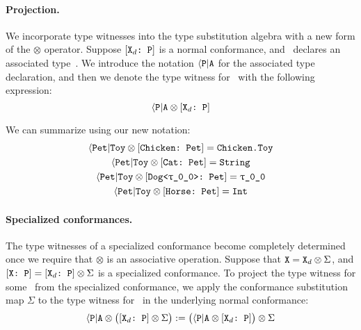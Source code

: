 \documentclass[../generics]{subfiles}
\begin{document}
\paragraph{Projection.}
We incorporate type witnesses into the type substitution algebra with a new form of the $\otimes$ operator. Suppose $[\texttt{$\texttt{X}_d$:~P}]$ is a normal conformance, and \tP\ declares an associated type~\nA. We introduce the notation $\langle\texttt{P}|\texttt{A}$ for the associated type declaration, and then we denote the type witness for \nA\ with the following expression:
\[\langle\texttt{P}|\texttt{A} \otimes [\texttt{$\texttt{X}_d$:~P}]\]

\begin{example}
We can summarize  using our new notation:
\begin{gather*}
\AssocType{Pet}{Toy}\otimes\ConfReq{Chicken}{Pet}=\texttt{Chicken.Toy}\\
\AssocType{Pet}{Toy}\otimes\ConfReq{Cat}{Pet}=\texttt{String}\\
\AssocType{Pet}{Toy}\otimes\ConfReq{Dog<\rT>}{Pet}=\rT\\
\AssocType{Pet}{Toy}\otimes\ConfReq{Horse}{Pet}=\texttt{Int}
\end{gather*}
\end{example}

\paragraph{Specialized conformances.}
The type witnesses of a specialized conformance become completely determined once we require that $\otimes$ is an associative operation. Suppose that $\texttt{X} = \texttt{X}_d \otimes \Sigma$, and $[\texttt{X:~P}]=[\texttt{$\texttt{X}_d$:~P}] \otimes \Sigma$ is a specialized conformance. To project the type witness for some \nA\ from the specialized conformance, we apply the conformance substitution map $\Sigma$ to the type witness for \nA\ in the underlying normal conformance:
\[
\langle\texttt{P}|\texttt{A} \otimes \bigl([\texttt{$\texttt{X}_d$:~P}]\otimes\Sigma\bigr) := \bigl(\langle\texttt{P}|\texttt{A} \otimes[\texttt{$\texttt{X}_d$:~P}]\bigr)\otimes\Sigma
\]
\end{document}
